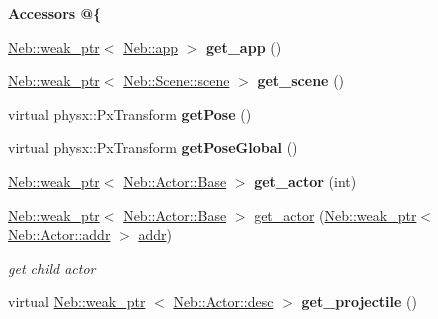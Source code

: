 \begin{Indent}{\bf \-Accessors @\{}\par
\begin{DoxyCompactItemize}
\item 
\hypertarget{classNeb_1_1Actor_1_1Base_ac94aa8055519ab639c12855d307afc03}{\hyperlink{classNeb_1_1weak__ptr}{\-Neb\-::weak\-\_\-ptr}$<$ \hyperlink{classNeb_1_1app}{\-Neb\-::app} $>$ {\bfseries get\-\_\-app} ()}\label{classNeb_1_1Actor_1_1Base_ac94aa8055519ab639c12855d307afc03}

\item 
\hypertarget{classNeb_1_1Actor_1_1Base_a9e3d8026a3268f70f9d87d0545f11544}{\hyperlink{classNeb_1_1weak__ptr}{\-Neb\-::weak\-\_\-ptr}$<$ \hyperlink{classNeb_1_1Scene_1_1scene}{\-Neb\-::\-Scene\-::scene} $>$ {\bfseries get\-\_\-scene} ()}\label{classNeb_1_1Actor_1_1Base_a9e3d8026a3268f70f9d87d0545f11544}

\item 
\hypertarget{classNeb_1_1Actor_1_1Base_aac89b4475a9443894c9814472702adcb}{virtual physx\-::\-Px\-Transform {\bfseries get\-Pose} ()}\label{classNeb_1_1Actor_1_1Base_aac89b4475a9443894c9814472702adcb}

\item 
\hypertarget{classNeb_1_1Actor_1_1Base_a76f34261b14ea648f42da355138efc9b}{virtual physx\-::\-Px\-Transform {\bfseries get\-Pose\-Global} ()}\label{classNeb_1_1Actor_1_1Base_a76f34261b14ea648f42da355138efc9b}

\item 
\hypertarget{classNeb_1_1Actor_1_1Base_a21c486c0e2c29ed1c4c2a9d581c022ea}{\hyperlink{classNeb_1_1weak__ptr}{\-Neb\-::weak\-\_\-ptr}$<$ \hyperlink{classNeb_1_1Actor_1_1Base}{\-Neb\-::\-Actor\-::\-Base} $>$ {\bfseries get\-\_\-actor} (int)}\label{classNeb_1_1Actor_1_1Base_a21c486c0e2c29ed1c4c2a9d581c022ea}

\item 
\hyperlink{classNeb_1_1weak__ptr}{\-Neb\-::weak\-\_\-ptr}$<$ \hyperlink{classNeb_1_1Actor_1_1Base}{\-Neb\-::\-Actor\-::\-Base} $>$ \hyperlink{classNeb_1_1Actor_1_1Base_ad5acc8ec9b76f0d49050bf6b50823508}{get\-\_\-actor} (\hyperlink{classNeb_1_1weak__ptr}{\-Neb\-::weak\-\_\-ptr}$<$ \hyperlink{classNeb_1_1Actor_1_1addr}{\-Neb\-::\-Actor\-::addr} $>$ \hyperlink{classNeb_1_1Actor_1_1addr}{addr})
\begin{DoxyCompactList}\small\item\em get child actor \end{DoxyCompactList}\item 
\hypertarget{classNeb_1_1Actor_1_1Base_a5aa9fd406bdf6363b6a8db3dd07a733c}{virtual \hyperlink{classNeb_1_1weak__ptr}{\-Neb\-::weak\-\_\-ptr}\*
$<$ \hyperlink{classNeb_1_1Actor_1_1desc}{\-Neb\-::\-Actor\-::desc} $>$ {\bfseries get\-\_\-projectile} ()}\label{classNeb_1_1Actor_1_1Base_a5aa9fd406bdf6363b6a8db3dd07a733c}


\end{DoxyCompactItemize}
\end{Indent}
